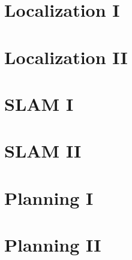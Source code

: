 \documentclass[landscape]{article}
\begin{document}
\begin{multicols}{3}
\vfill

\section{Localization I}

\blindtext[3]

\vfill

\section{Localization II}

\blindtext[3]

\vfill

\section{SLAM I}

\blindtext[3]

\vfill

\section{SLAM II}

\blindtext[3]

\vfill

\section{Planning I}

\blindtext[3]

\vfill

\section{Planning II}

\blindtext[3]






\end{multicols}
\end{document}
